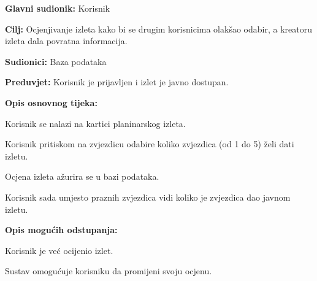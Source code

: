 		\noindent {}
		\begin{packed_item}
			
			\item \textbf{Glavni sudionik: } Korisnik
			\item  \textbf{Cilj:} Ocjenjivanje izleta kako bi se drugim korisnicima olakšao odabir, a kreatoru izleta dala povratna informacija.
			\item  \textbf{Sudionici:} Baza podataka
			\item  \textbf{Preduvjet:} Korisnik je prijavljen i izlet je javno dostupan.
			\item  \textbf{Opis osnovnog tijeka:}
			
			\item[] \begin{packed_enum}
				
				\item Korisnik se nalazi na kartici planinarskog izleta.
					\item Korisnik pritiskom na zvjezdicu odabire koliko zvjezdica (od 1 do 5) želi dati izletu.
					\item Ocjena izleta ažurira se u bazi podataka.
					\item Korisnik sada umjesto praznih zvjezdica vidi koliko je zvjezdica dao javnom izletu. 
				
			\end{packed_enum}
			
			\item  \textbf{Opis mogućih odstupanja:}
			
			\item[] \begin{packed_item}
					
					\item[3.a] Korisnik je već ocijenio izlet.
					\item[] \begin{packed_enum}
						
						\item Sustav omogućuje korisniku da promijeni svoju ocjenu.
					\end{packed_enum}
				
				
			\end{packed_item}
		\end{packed_item}

